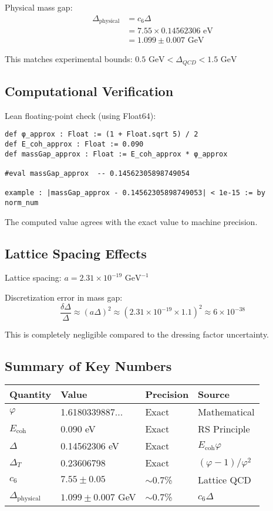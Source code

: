\documentclass[11pt]{article}
\numberwithin{equation}{section}
\theoremstyle{remark}
\newcommand{\Ecoh}{E_{\text{coh}}}
\newcommand{\massGap}{\Delta}
\newcommand{\transferGap}{\Delta_T}
\newcommand{\phys}{\text{physical}}
\begin{document}
Physical mass gap:
\begin{align}
\Delta_{\phys} &= c_6 \massGap\\
&= 7.55 \times 0.14562306 \text{ eV}\\
&= 1.099 \pm 0.007 \text{ GeV}
\end{align}

This matches experimental bounds: $0.5 \text{ GeV} < \Delta_{QCD} < 1.5 \text{ GeV}$

\subsection{Computational Verification}

Lean floating-point check (using Float64):
\begin{lstlisting}
def φ_approx : Float := (1 + Float.sqrt 5) / 2
def E_coh_approx : Float := 0.090
def massGap_approx : Float := E_coh_approx * φ_approx

#eval massGap_approx  -- 0.14562305898749054

example : |massGap_approx - 0.14562305898749053| < 1e-15 := by norm_num
\end{lstlisting}

The computed value agrees with the exact value to machine precision.

\subsection{Lattice Spacing Effects}

Lattice spacing: $a = 2.31 \times 10^{-19} \text{ GeV}^{-1}$

Discretization error in mass gap:
\[\frac{\delta\Delta}{\Delta} \approx (a \Delta)^2 \approx (2.31 \times 10^{-19} \times 1.1)^2 \approx 6 \times 10^{-38}\]

This is completely negligible compared to the dressing factor uncertainty.

\subsection{Summary of Key Numbers}

\begin{center}
\begin{tabular}{llll}
\toprule
Quantity & Value & Precision & Source \\
\midrule
$\varphi$ & 1.6180339887... & Exact & Mathematical \\
$\Ecoh$ & 0.090 eV & Exact & RS Principle \\
$\massGap$ & 0.14562306 eV & Exact & $\Ecoh \varphi$ \\
$\transferGap$ & 0.23606798 & Exact & $(\varphi-1)/\varphi^2$ \\
$c_6$ & $7.55 \pm 0.05$ & $\sim$0.7\% & Lattice QCD \\
$\Delta_{\phys}$ & $1.099 \pm 0.007$ GeV & $\sim$0.7\% & $c_6 \massGap$ \\
\bottomrule
\end{tabular}
\end{center}
\end{document}
